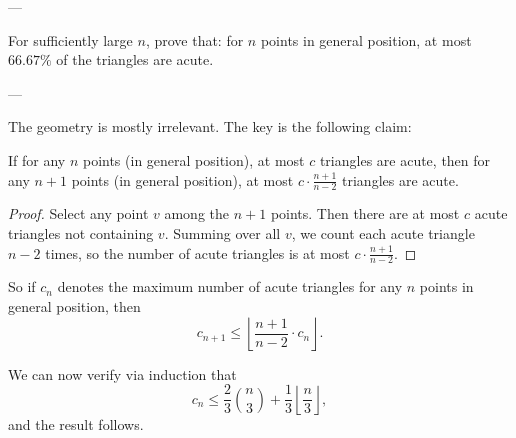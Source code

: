 
---

For sufficiently large $n$, prove that: for $n$ points in general position, at most $66.67\%$ of the triangles are acute.

---

The geometry is mostly irrelevant. The key is the following claim:
\begin{claim*}
    If for any $n$ points (in general position), at most $c$ triangles are acute, then for any $n+1$ points (in general position), at most $c\cdot\frac{n+1}{n-2}$ triangles are acute.
\end{claim*}
\begin{proof}
    Select any point $v$ among the $n+1$ points. Then there are at most $c$ acute triangles not containing $v$. Summing over all $v$, we count each acute triangle $n-2$ times, so the number of acute triangles is at most $c\cdot\frac{n+1}{n-2}$.
\end{proof}

So if $c_n$ denotes the maximum number of acute triangles for any $n$ points in general position, then
\[c_{n+1}\le\left\lfloor\frac{n+1}{n-2}\cdot c_n\right\rfloor.\]

We can now verify via induction that
\[c_n\le\frac23\binom n3+\frac13\left\lfloor\frac n3\right\rfloor,\]
and the result follows.

